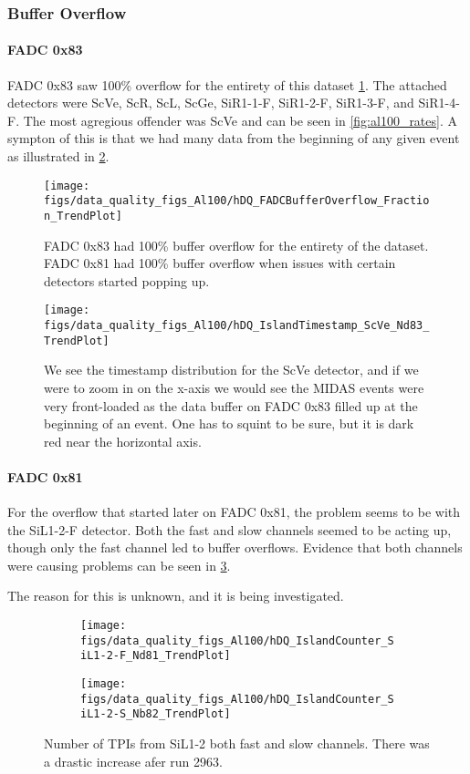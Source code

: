 \documentclass[a4paper]{article}
\begin{document}
\subsubsection{Buffer Overflow}
\label{sec:al100_buffer_overflow}
\paragraph{FADC 0x83}
FADC 0x83 saw 100\% overflow for the entirety of this dataset \ref{fig:al100_buffer_overflow}.
The attached detectors were ScVe, ScR, ScL, ScGe, SiR1-1-F, SiR1-2-F, SiR1-3-F, and SiR1-4-F.
The most agregious offender was ScVe and can be seen in \ref{fig:al100_rates}. A sympton of this
is that we had many data from the beginning of any given event as illustrated in
\ref{fig:al100_scve_timestamps}.

\begin{figure}
  \texttt{[image: figs/data\_quality\_figs\_Al100/hDQ\_FADCBufferOverflow\_Fraction\_TrendPlot]}
  \caption{FADC 0x83 had 100\% buffer overflow
    for the entirety of the dataset. FADC 0x81 had 100\% buffer overflow when
    issues with certain detectors started popping up.}
  \label{fig:al100_buffer_overflow}
\end{figure}

\begin{figure}
  \texttt{[image: figs/data\_quality\_figs\_Al100/hDQ\_IslandTimestamp\_ScVe\_Nd83\_TrendPlot]}
  \caption{We see the timestamp distribution for the ScVe detector,
    and if we were to zoom in on the x-axis we would see the MIDAS events were very front-loaded
    as the data buffer on FADC 0x83 filled up at the beginning of an event.
    One has to squint to be sure, but it is dark red near the horizontal axis.}
  \label{fig:al100_scve_timestamps}
\end{figure}

\paragraph{FADC 0x81}
For the overflow that started later on FADC 0x81, the problem seems to be with the SiL1-2-F
detector. Both the fast and slow channels seemed to be acting up, though only the fast channel
led to buffer overflows. Evidence that both channels were causing problems can be seen
in \ref{fig:al100_sil12_n}.

The reason for this is unknown, and it is being investigated.


\begin{figure}
  \begin{subfigure}{0.5\textwidth}
    \texttt{[image: figs/data\_quality\_figs\_Al100/hDQ\_IslandCounter\_SiL1-2-F\_Nd81\_TrendPlot]}
  \end{subfigure}%
  \begin{subfigure}{0.5\textwidth}
    \texttt{[image: figs/data\_quality\_figs\_Al100/hDQ\_IslandCounter\_SiL1-2-S\_Nb82\_TrendPlot]}
  \end{subfigure}
  \caption{Number of TPIs from SiL1-2 both fast and slow channels. There
    was a drastic increase afer run 2963.}
  \label{fig:al100_sil12_n}
\end{figure}
\end{document}
